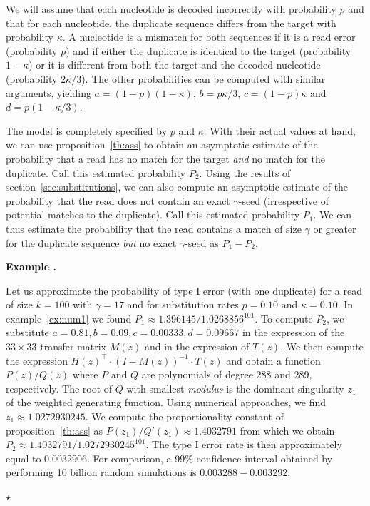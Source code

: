 \documentclass{article}
\newcounter{examplecounter}
\newenvironment{example}
{\small\vspace{0.5\baselineskip}
  \refstepcounter{examplecounter}%
  \noindent\textbf{Example \arabic{examplecounter}.}%
}{\vspace{-0.2\baselineskip}\begin{center}%
  $\star$\end{center}\vspace{0.5\baselineskip}}
\begin{document}
We will assume that each nucleotide is decoded incorrectly with
probability $p$ and that for each nucleotide, the duplicate sequence
differs from the target with probability $\kappa$. A nucleotide is a
mismatch for both sequences if it is a read error (probability $p$) and if
either the duplicate is identical to the target (probability $1-\kappa$)
or it is different from both the target and the decoded nucleotide
(probability $2\kappa/3$). The other probabilities can be computed with
similar arguments, yielding $a = (1-p)(1-\kappa)$, $b = p\kappa/3$, $c =
(1-p)\kappa$ and $d = p(1-\kappa/3)$.

The model is completely specified by $p$ and $\kappa$. With their actual
values at hand, we can use proposition~\ref{th:ass} to obtain an
asymptotic estimate of the probability that a read has no match for the
target \emph{and} no match for the duplicate. Call this estimated
probability $P_2$. Using the results of section~\ref{sec:substitutions},
we can also compute an asymptotic estimate of the probability that the
read does not contain an exact $\gamma$-seed (irrespective of potential
matches to the duplicate). Call this estimated probability $P_1$. We can
thus estimate the probability that the read contains a match of size
$\gamma$ or greater for the duplicate sequence \emph{but} no exact
$\gamma$-seed as $P_1 - P_2$.

\begin{example}
\label{ex:num5}
Let us approximate the probability of type I error (with one duplicate)
for a read of size $k=100$ with $\gamma=17$ and for substitution rates
$p=0.10$ and $\kappa=0.10$. In example~\ref{ex:num1} we found $P_1 \approx
1.396145 / 1.0268856^{101}$. To compute $P_2$, we substitute $a=0.81,
b=0.09, c=0.00333, d=0.09667$ in the expression of the $33 \times 33$
transfer matrix $M(z)$ and in the expression of $T(z)$. We then compute
the expression $H(z)^\top \cdot (I-M(z))^{-1} \cdot T(z)$ and obtain a
function $P(z)/Q(z)$ where $P$ and $Q$ are polynomials of degree $288$ and
$289$, respectively. The root of $Q$ with smallest \textit{modulus} is the
dominant singularity $z_1$ of the weighted generating function. Using
numerical approaches, we find $z_1 \approx 1.0272930245$. We compute the
proportionality constant of proposition~\ref{th:ass} as $P(z_1)/Q'(z_1)
\approx 1.4032791$ from which we obtain $P_2 \approx
1.4032791/1.0272930245^{101}$. The type I error rate is then approximately
equal to $0.0032906$. For comparison, a 99\% confidence interval obtained
by performing 10 billion random simulations is $0.003288-0.003292$.
\end{example}
\end{document}
